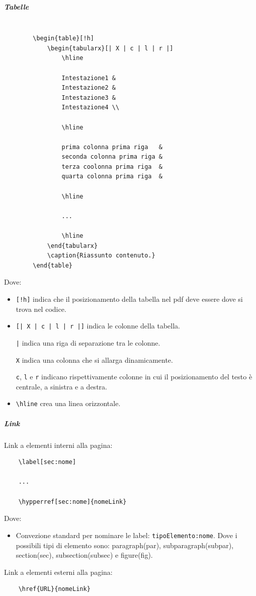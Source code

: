 \subparagraph{Tabelle}
\begin{lstlisting}

        \begin{table}[!h]
            \begin{tabularx}[| X | c | l | r |]
                \hline

                Intestazione1 &
                Intestazione2 &
                Intestazione3 &
                Intestazione4 \\

                \hline

                prima colonna prima riga   &
                seconda colonna prima riga &
                terza coolonna prima riga  &
                quarta colonna prima riga  &

                \hline

                ...

                \hline
            \end{tabularx}
            \caption{Riassunto contenuto.}
        \end{table}
\end{lstlisting}
Dove:
\begin{itemize}
    \item \lstinline+[!h]+ indica che il posizionamento della tabella nel pdf deve essere dove si trova nel codice.
    
    \item \lstinline+[| X | c | l | r |]+ indica le colonne della tabella.

    \lstinline+|+ indica una riga di separazione tra le colonne.

    \lstinline+X+ indica una colonna che si allarga dinamicamente.

    \lstinline+c+, \lstinline+l+ e \lstinline+r+ indicano rispettivamente colonne in cui il posizionamento del testo è centrale, a sinistra e a destra.

    \item \lstinline+\hline+ crea una linea orizzontale.
\end{itemize}

\subparagraph{Link}
Link a elementi interni alla pagina:
\begin{lstlisting}
    \label[sec:nome]

    ... 

    \hypperref[sec:nome]{nomeLink}
\end{lstlisting}
Dove:
\begin{itemize}
    \item Convezione standard per nominare le label: \texttt{tipoElemento:nome}.
    Dove i possibili tipi di elemento sono: paragraph(par), subparagraph(subpar), section(sec), subsection(subsec) e figure(fig).
\end{itemize}
\noindent Link a elementi esterni alla pagina:
\begin{lstlisting}
    \href{URL}{nomeLink}
\end{lstlisting}

